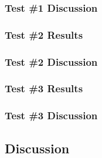 \documentclass[../../main.tex]{subfiles}
\begin{document}
		\subsubsection{Test \#1 Discussion}

		\subsubsection{Test \#2 Results}
		\subsubsection{Test \#2 Discussion}

		\subsubsection{Test \#3 Results}
		\subsubsection{Test \#3 Discussion}

	\subsection{Discussion}
\end{document}
